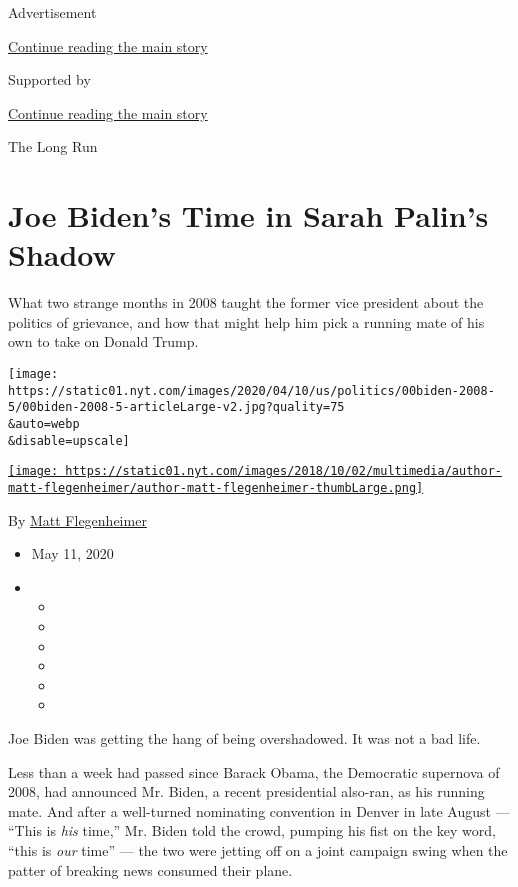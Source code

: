 Advertisement

\protect\hyperlink{after-top}{Continue reading the main story}

Supported by

\protect\hyperlink{after-sponsor}{Continue reading the main story}

The Long Run

\hypertarget{joe-bidens-time-in-sarah-palins-shadow}{%
\section{Joe Biden's Time in Sarah Palin's
Shadow}\label{joe-bidens-time-in-sarah-palins-shadow}}

What two strange months in 2008 taught the former vice president about
the politics of grievance, and how that might help him pick a running
mate of his own to take on Donald Trump.

\texttt{[image: https://static01.nyt.com/images/2020/04/10/us/politics/00biden-2008-5/00biden-2008-5-articleLarge-v2.jpg?quality=75\\\&auto=webp\\\&disable=upscale]}

\href{https://www.nytimes.com/by/matt-flegenheimer}{\texttt{[image: https://static01.nyt.com/images/2018/10/02/multimedia/author-matt-flegenheimer/author-matt-flegenheimer-thumbLarge.png]}}

By \href{https://www.nytimes.com/by/matt-flegenheimer}{Matt
Flegenheimer}

\begin{itemize}
\item
  May 11, 2020
\item
  \begin{itemize}
  \item
  \item
  \item
  \item
  \item
  \item
  \end{itemize}
\end{itemize}

Joe Biden was getting the hang of being overshadowed. It was not a bad
life.

Less than a week had passed since Barack Obama, the Democratic supernova
of 2008, had announced Mr. Biden, a recent presidential also-ran, as his
running mate. And after a well-turned nominating convention in Denver in
late August --- ``This is \emph{his} time,'' Mr. Biden told the crowd,
pumping his fist on the key word, ``this is \emph{our} time'' --- the
two were jetting off on a joint campaign swing when the patter of
breaking news consumed their plane.

